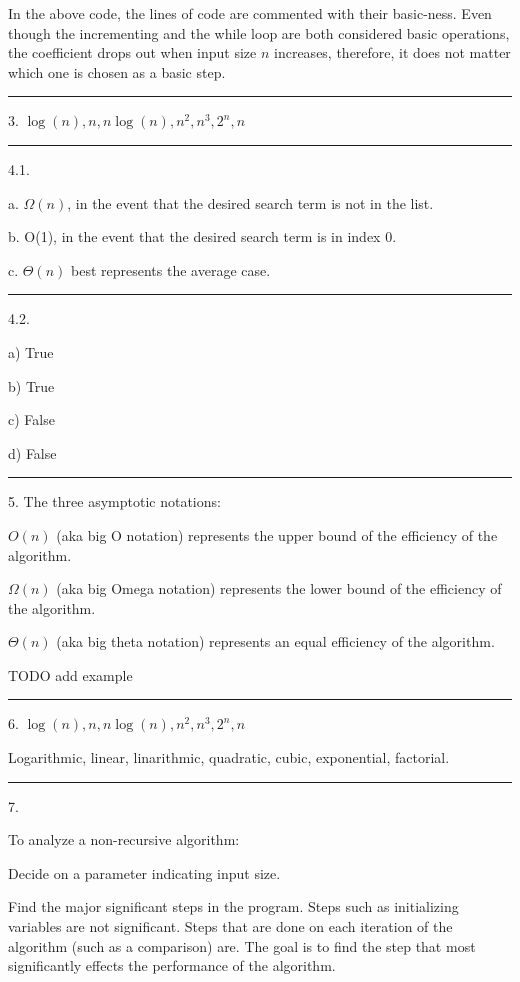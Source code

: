 \documentclass{article}
\begin{document}
In the above code, the lines of code are commented with their basic-ness. Even though the incrementing and the while loop are both considered basic operations, the coefficient drops out when input size $n$ increases, therefore, it does not matter which one is chosen as a basic step. 

\noindent\rule{8cm}{0.4pt}

3. $\log (n), n, n\log (n), n^2, n^3, 2^n, n\!$

\noindent\rule{8cm}{0.4pt}


4.1.

a. $\Omega(n)$, in the event that the desired search term is not in the list. 
	
b. O(1), in the event that the desired search term is in index 0. 

c. $\Theta(n)$ best represents the average case. 

\noindent\rule{2cm}{0.4pt}

4.2.

a) True

b) True

c) False

d) False


\noindent\rule{8cm}{0.4pt}

5. The three asymptotic notations:

$O(n)$ (aka big O notation) represents the upper bound of the efficiency of the algorithm.

$\Omega(n)$ (aka big Omega notation) represents the lower bound of the efficiency of the algorithm. 

$\Theta(n)$ (aka big theta notation) represents an equal efficiency of the algorithm. 


TODO add example

\noindent\rule{8cm}{0.4pt}


6.  $\log (n), n, n\log (n), n^2, n^3, 2^n, n\!$

	Logarithmic, linear, linarithmic, quadratic, cubic, exponential, factorial. 

\noindent\rule{8cm}{0.4pt}

7.  

To analyze a non-recursive algorithm:

Decide on a parameter indicating input size. 

Find the major significant steps in the program. Steps such as initializing variables are not significant. Steps that are done on each iteration of the algorithm (such as a comparison) are. The goal is to find the step that most significantly effects the performance of the algorithm. 
\end{document}
